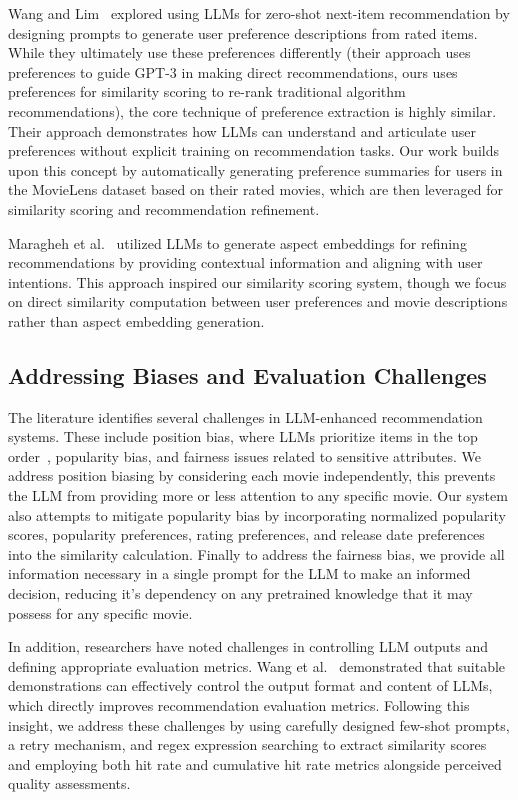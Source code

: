 \documentclass[sigconf]{acmart}
\begin{document}
Wang and Lim~\cite{wang2023zero} explored using LLMs for zero-shot next-item recommendation by designing prompts to generate user preference descriptions from rated items. While they ultimately use these preferences differently (their approach uses preferences to guide GPT-3 in making direct recommendations, ours uses preferences for similarity scoring to re-rank traditional algorithm recommendations), the core technique of preference extraction is highly similar. Their approach demonstrates how LLMs can understand and articulate user preferences without explicit training on recommendation tasks. Our work builds upon this concept by automatically generating preference summaries for users in the MovieLens dataset based on their rated movies, which are then leveraged for similarity scoring and recommendation refinement.

Maragheh et al.~\cite{yousefi2024llm} utilized LLMs to generate aspect embeddings for refining recommendations by providing contextual information and aligning with user intentions. This approach inspired our similarity scoring system, though we focus on direct similarity computation between user preferences and movie descriptions rather than aspect embedding generation.

\subsection{Addressing Biases and Evaluation Challenges}

The literature identifies several challenges in LLM-enhanced recommendation systems. These include position bias, where LLMs prioritize items in the top order~\cite{wu2024survey}, popularity bias, and fairness issues related to sensitive attributes. We address position biasing by considering each movie independently, this prevents the LLM from providing more or less attention to any specific movie. Our system also attempts to mitigate popularity bias by incorporating normalized popularity scores, popularity preferences, rating preferences, and release date preferences into the similarity calculation. Finally to address the fairness bias, we provide all information necessary in a single prompt for the LLM to make an informed decision, reducing it's dependency on any pretrained knowledge that it may possess for any specific movie.

In addition, researchers have noted challenges in controlling LLM outputs and defining appropriate evaluation metrics. Wang et al.~\cite{wang2023rethinking} demonstrated that suitable demonstrations can effectively control the output format and content of LLMs, which directly improves recommendation evaluation metrics. Following this insight, we address these challenges by using carefully designed few-shot prompts, a retry mechanism, and regex expression searching to extract similarity scores and employing both hit rate and cumulative hit rate metrics alongside perceived quality assessments.
\end{document}
